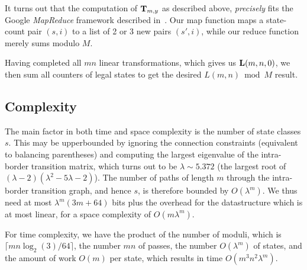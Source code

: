 \documentclass{article}
\begin{document}
It turns out that the computation of $\mathbf{T}_{m,y}$ as described above,
{\em precisely} fits the Google {\em MapReduce} framework described
in~\cite{DG04}. Our map function maps a state-count pair $(s,i)$ to a
list of 2 or 3 new pairs $(s',i)$, while our reduce function merely
sums modulo $M$.

Having completed all $mn$ linear transformations,
which gives us $\mathbf{L}(m,n,0)$, we then sum all counters of legal
states to get the desired $L(m,n) \bmod M$ result.

\subsection{Complexity}
The main factor in both time and space complexity is the number of
state classes $s$. This may be upperbounded by ignoring the
connection constraints (equivalent to balancing parentheses) and
computing the largest eigenvalue of the intra-border transition matrix,
which turns out to be $\lambda \sim 5.372$ (the largest root
of $(\lambda-2)(\lambda^2-5\lambda-2)$). The number of paths
of length $m$ through the intra-border transition graph, and hence $s$,
is therefore bounded by $O(\lambda^m)$. 
We thus need at most $\lambda^m(3m+64)$ bits plus the
overhead for the datastructure which is at most linear,
for a space complexity of $O(m \lambda^m)$.

For time complexity, we have the product of the number of moduli,
which is $\lceil mn \log_2(3) / 64\rceil$, the number $mn$ of passes,
the number $O(\lambda^m)$ of states, and the amount of work $O(m)$ per state,
which results in time $O(m^3 n^2 \lambda^m)$.
\end{document}
